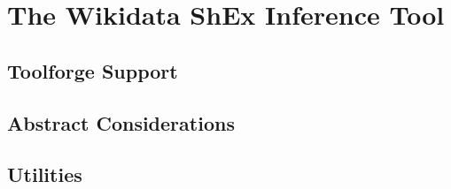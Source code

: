 \chapter{The Wikidata ShEx Inference Tool}
\label{ch:wdsi}

\section{Toolforge Support}
\label{sec:wdsi:Toolforge}

\section{Abstract Considerations}
\label{sec:wdsi:abstract}

\section{Utilities}
\label{sec:wdsi:utilities}
